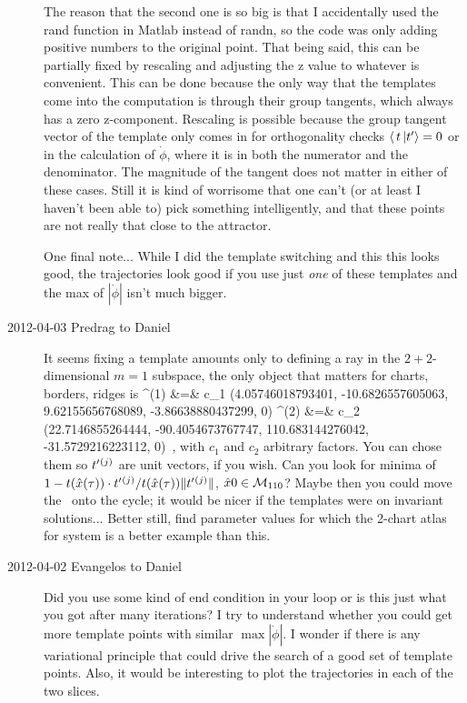 \begin{description}
The reason that the second one is so big is that I accidentally used the
rand function in Matlab instead of randn, so the code was only adding
positive numbers to the original point. That being said, this can be
partially fixed by rescaling and adjusting the z value to whatever is
convenient. This can be done because the only way that the templates come
into the computation is through their group tangents, which always has a
zero z-component. Rescaling is possible because the group tangent vector
of the template only comes in for orthogonality checks
$\braket{\,t\,}{\sliceTan{}{}} = 0$ or in the calculation of
$\dot{\phi}$, where it is in both the numerator and the denominator. The
magnitude of the tangent does not matter in either of these cases. Still
it is kind of worrisome that one can't (or at least I haven't been able
to) pick something intelligently, and that these points are not really
that close to the attractor.

One final note... While I did the template switching and this this looks
good, the trajectories look good if you use just \emph{one} of these
templates and the max of $|\dot{\phi}|$ isn't much bigger.

\item[2012-04-03 Predrag to Daniel] It seems fixing a template amounts only to defining a ray in the
$2 + 2$-dimensional $m=1$ subspace, the only object that matters for charts, borders, ridges is
\bea
\sliceTan{}{}^{(1)} &=& c_1 (4.05746018793401, -10.6826557605063,  9.62155656768089, -3.86638880437299, 0)
    \continue
\sliceTan{}{}^{(2)} &=& c_2 (22.7146855264444, -90.4054673767747, 110.683144276042, -31.5729216223112, 0)
\,,
\label{DanielTmpls}
\eea
with $c_1$ and $c_2$ arbitrary factors. You can chose them so
$t'_{}{}^{(j)}$ are unit vectors, if you wish. Can you look for
minima of
$1-t(\hat{x}(\tau)) \cdot t'_{}{}^{(j)}
   / t(\hat{x}(\tau)) \|{t'_{}{}^{(j)}}\|$, $\hat{x}{0} \in {\cal M}_{110}$?
Maybe then you could move the \template\ onto the cycle; it would be
nicer if the templates were on invariant solutions... Better still, find
parameter values for which the 2-chart atlas for {\twoMode} system is a
better example than this.

\item[2012-04-02 Evangelos to Daniel] Did you use some kind of end condition in
your loop or is this just what you got after many iterations? I try to understand
whether you could get more template points with similar $\max |\dot{\phi}|$.
I wonder if there is any variational principle that could drive the search of
a good set of template points.
Also, it would be interesting to plot the trajectories in each of the two slices.


\end{description}
